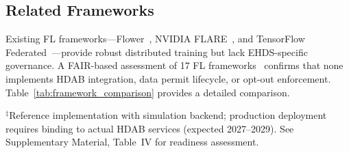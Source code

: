 \documentclass[conference,letterpaper]{IEEEtran}
\begin{document}
\subsection{Related Frameworks}

Existing FL frameworks---Flower~\cite{beutel2023flower}, NVIDIA FLARE~\cite{nvflare2023}, and TensorFlow Federated~\cite{tff2019}---provide robust distributed training but lack EHDS-specific governance. A FAIR-based assessment of 17 FL frameworks~\cite{chaverodiez2026fair} confirms that none implements HDAB integration, data permit lifecycle, or opt-out enforcement. Table~\ref{tab:framework_comparison} provides a detailed comparison.

\begin{table}[htbp]
\centering
\caption{Framework Comparison: FL-EHDS vs Existing FL Frameworks}
\label{tab:framework_comparison}

\vspace{1mm}
\footnotesize{$^\ddagger$Reference implementation with simulation backend; production deployment requires binding to actual HDAB services (expected 2027--2029). See Supplementary Material, Table~IV for readiness assessment.}
\end{table}
\end{document}

